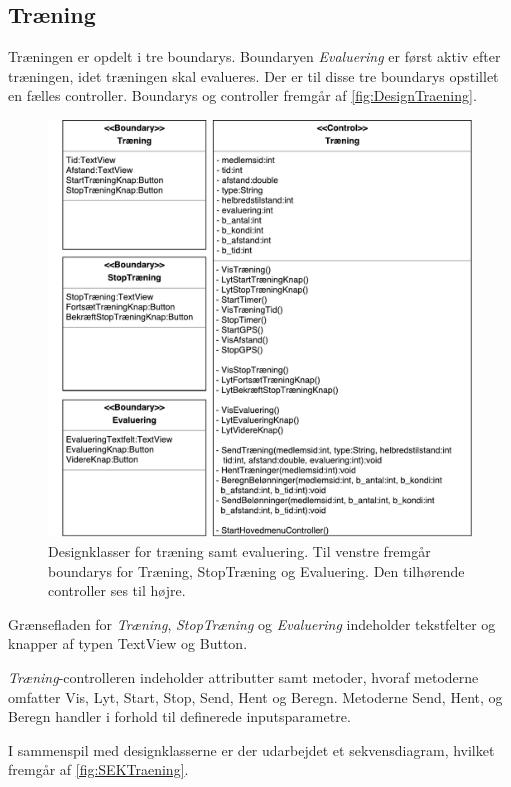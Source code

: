 \subsection*{Træning}
Træningen er opdelt i tre boundarys. Boundaryen \textit{Evaluering} er først aktiv efter træningen, idet træningen skal evalueres. Der er til disse tre boundarys opstillet en fælles controller. Boundarys og controller fremgår af \autoref{fig:DesignTraening}. 

\begin{figure} [H]
\centering
\includegraphics[width=1\textwidth]{figures/MVC/MVCTraening}
\caption{Designklasser for træning samt evaluering. Til venstre fremgår boundarys for Træning, StopTræning og Evaluering. Den tilhørende controller ses til højre.}
\label{fig:DesignTraening}
\end{figure}

\noindent
Grænsefladen for \textit{Træning}, \textit{StopTræning} og \textit{Evaluering} indeholder tekstfelter og knapper af typen TextView og Button. 


\textit{Træning}-controlleren indeholder attributter samt metoder, hvoraf metoderne omfatter Vis, Lyt, Start, Stop, Send, Hent og Beregn. Metoderne Send, Hent, og Beregn handler i forhold til definerede inputsparametre.  

I sammenspil med designklasserne er der udarbejdet et sekvensdiagram, hvilket fremgår af \autoref{fig:SEKTraening}. 

